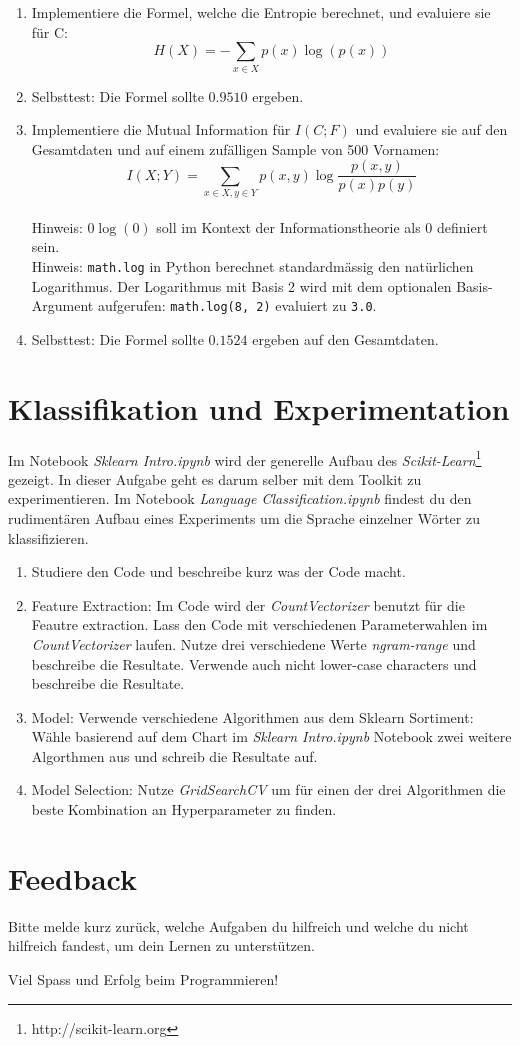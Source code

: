 \documentclass[a4paper,10pt]{article}
\begin{document}
\begin{enumerate}
\item Implementiere die Formel, welche die Entropie berechnet, und evaluiere sie für C:
\begin{equation}
H(X) = -\sum_{x \in X} {p(x)\log(p(x))}
\end{equation}
\item Selbsttest: Die Formel sollte $0.9510$ ergeben.
\item Implementiere die Mutual Information für $I(C;F)$ und evaluiere sie auf den Gesamtdaten und auf einem zufälligen Sample von 500 Vornamen:
\begin{equation}
I(X;Y) = \sum_{x \in X, y \in Y}{p(x,y) \log{\frac{p(x,y)}{p(x)p(y)}}}
\end{equation}\\ Hinweis: $0\log(0)$ soll im Kontext der Informationstheorie als $0$ definiert sein.
\\ Hinweis: \texttt{math.log} in Python berechnet standardmässig den natürlichen Logarithmus. Der Logarithmus mit Basis 2 wird mit dem optionalen Basis-Argument aufgerufen: \lstinline!math.log(8, 2)! evaluiert zu \lstinline!3.0!.
\item Selbsttest: Die Formel sollte $0.1524$ ergeben auf den Gesamtdaten.
\end{enumerate}



\section{Klassifikation und Experimentation }
Im Notebook \emph{Sklearn Intro.ipynb} wird der generelle Aufbau des \emph{Scikit-Learn}\footnote{http://scikit-learn.org} gezeigt. In dieser Aufgabe geht es darum selber mit dem Toolkit zu experimentieren. 
Im Notebook \emph{Language Classification.ipynb} findest du den rudimentären Aufbau eines Experiments um die Sprache einzelner Wörter zu klassifizieren. 
\begin{enumerate}
\item Studiere den Code und beschreibe kurz was der Code macht. 
\item Feature Extraction: Im Code wird der \emph{CountVectorizer} benutzt für die Feautre extraction. Lass den Code mit verschiedenen Parameterwahlen im \emph{CountVectorizer} laufen. Nutze drei verschiedene Werte \emph{ngram-range} und beschreibe die Resultate. Verwende auch nicht lower-case characters und beschreibe die Resultate. 
\item Model: Verwende verschiedene Algorithmen aus dem Sklearn Sortiment: Wähle basierend auf dem Chart im \emph{Sklearn Intro.ipynb} Notebook zwei weitere Algorthmen aus und schreib die Resultate auf.
\item Model Selection: Nutze \emph{GridSearchCV} um für einen der drei Algorithmen die beste Kombination an Hyperparameter zu finden. 
\end{enumerate}
\section{Feedback}
Bitte melde kurz zurück, welche Aufgaben du hilfreich und welche du nicht hilfreich fandest, um dein Lernen zu unterstützen.

\hfil Viel Spass und Erfolg beim Programmieren!
\end{document}
